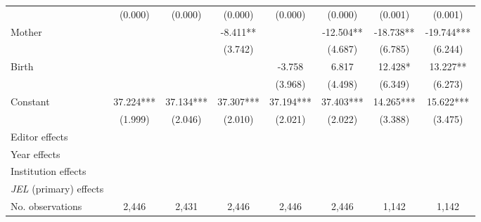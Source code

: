 \begin{table}
\begin{adjustwidth}{-0.085cm}{}
\begin{threeparttable}
\begin{tabular}{p{2.64cm}SSSSSSS}
                                          &     (0.000)   &     (0.000)   &     (0.000)   &     (0.000)   &     (0.000)   &     (0.001)   &     (0.001)   \\
            Mother                        &               &               &      -8.411** &               &     -12.504** &     -18.738** &     -19.744***\\
                                          &               &               &     (3.742)   &               &     (4.687)   &     (6.785)   &     (6.244)   \\
            Birth                         &               &               &               &      -3.758   &       6.817   &      12.428*  &      13.227** \\
                                          &               &               &               &     (3.968)   &     (4.498)   &     (6.349)   &     (6.273)   \\
            Constant                      &      37.224***&      37.134***&      37.307***&      37.194***&      37.403***&      14.265***&      15.622***\\
                                          &     (1.999)   &     (2.046)   &     (2.010)   &     (2.021)   &     (2.022)   &     (3.388)   &     (3.475)   \\
            \midrule
            Editor effects                &           {}   &           {}   &           {}   &           {}   &           {}   &           {}   &           {}   \\
            Year effects                  &           {}   &           {}   &           {}   &           {}   &           {}   &           {}   &           {}   \\
            Institution effects           &           {}   &           {}   &           {}   &           {}   &           {}   &           {}   &           {}   \\
            \textit{JEL} (primary) effects&               &               &               &               &               &               &           {}   \\
            No. observations              &       2,446   &       2,431   &       2,446   &       2,446   &       2,446   &       1,142   &       1,142   \\

\end{tabular}
\end{threeparttable}
\end{adjustwidth}
\end{table}
